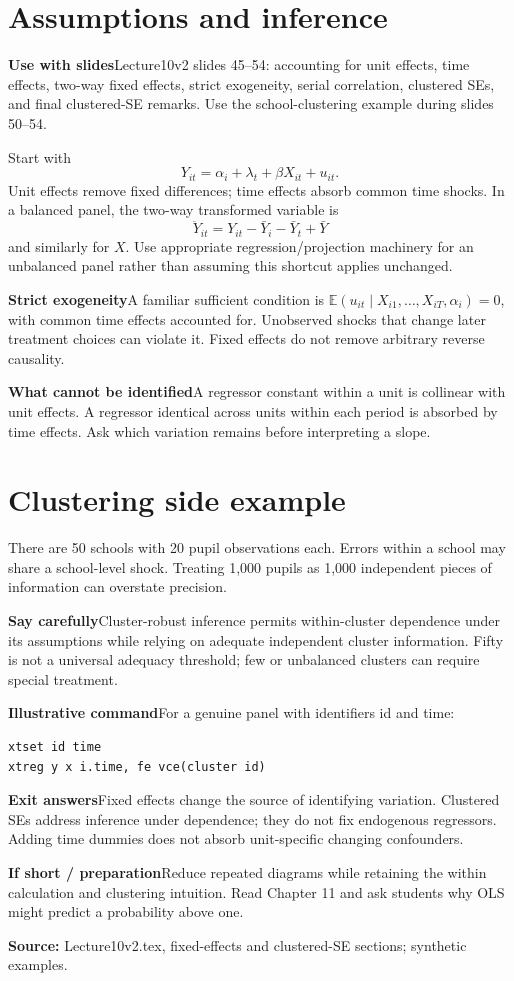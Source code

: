 \documentclass[11pt,a4paper]{article}
\newcommand{\heading}[1]{\section*{\color{accent}#1}}
\newcommand{\cue}[2]{\par\noindent\textbf{#1}\quad #2\par}
\newcommand{\E}{\mathbb{E}}
\begin{document}
\newpage
\heading{Assumptions and inference}
\cue{Use with slides}{Lecture10v2 slides 45--54: accounting for unit effects, time effects, two-way fixed effects, strict exogeneity, serial correlation, clustered SEs, and final clustered-SE remarks. Use the school-clustering example during slides 50--54.}
Start with
\[
Y_{it}=\alpha_i+\lambda_t+\beta X_{it}+u_{it}.
\]
Unit effects remove fixed differences; time effects absorb common time shocks. In a balanced panel, the two-way transformed variable is
\[
\ddot Y_{it}=Y_{it}-\bar Y_i-\bar Y_t+\bar Y
\]
and similarly for $X$. Use appropriate regression/projection machinery for an unbalanced panel rather than assuming this shortcut applies unchanged.
\cue{Strict exogeneity}{A familiar sufficient condition is
$\E(u_{it}\mid X_{i1},\ldots,X_{iT},\alpha_i)=0$, with common time effects accounted for. Unobserved shocks that change later treatment choices can violate it. Fixed effects do not remove arbitrary reverse causality.}
\cue{What cannot be identified}{A regressor constant within a unit is collinear with unit effects. A regressor identical across units within each period is absorbed by time effects. Ask which variation remains before interpreting a slope.}
\heading{Clustering side example}
There are 50 schools with 20 pupil observations each. Errors within a school may share a school-level shock. Treating 1,000 pupils as 1,000 independent pieces of information can overstate precision.
\cue{Say carefully}{Cluster-robust inference permits within-cluster dependence under its assumptions while relying on adequate independent cluster information. Fifty is not a universal adequacy threshold; few or unbalanced clusters can require special treatment.}
\cue{Illustrative command}{For a genuine panel with identifiers id and time:}
\begin{verbatim}
xtset id time
xtreg y x i.time, fe vce(cluster id)
\end{verbatim}
\cue{Exit answers}{Fixed effects change the source of identifying variation. Clustered SEs address inference under dependence; they do not fix endogenous regressors. Adding time dummies does not absorb unit-specific changing confounders.}
\cue{If short / preparation}{Reduce repeated diagrams while retaining the within calculation and clustering intuition. Read Chapter 11 and ask students why OLS might predict a probability above one.}
\textbf{Source:} Lecture10v2.tex, fixed-effects and clustered-SE sections; synthetic examples.
\end{document}
